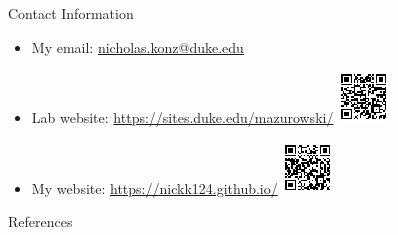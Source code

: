\documentclass[final,hyperref={pdfpagelabels=false}]{beamer}
\begin{document}
\begin{frame}[t]
\begin{columns}[t]
\begin{column}{.47\textwidth}
\begin{block}{Contact Information}
\begin{itemize}
\item My email: \href{mailto:nicholas.konz@duke.edu}{nicholas.konz@duke.edu}
\item Lab website: \url{https://sites.duke.edu/mazurowski/} {\includegraphics[scale=5.0]{qrcodes/code_tolabsite.pdf}}
\item My website: \url{https://nickk124.github.io/} {\includegraphics[scale=5.0]{qrcodes/code_tomysite.pdf}}
\end{itemize}
\end{block}
\begin{block}{References}
        
\small{
}

\end{block}

\end{column} %

\begin{column}{.02\textwidth}\end{column} %
 
\end{columns} %

\end{frame} %
\end{document}
